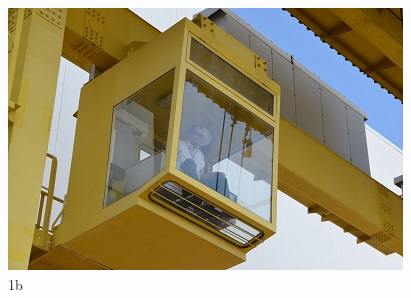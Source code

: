 \begin{figure}[h!]
  \centering
  \includegraphics[width=1\linewidth]{Fotos/Novembro2014/10.jpg}
  \caption{1b}
  \label{nov20134}
\end{figure}
